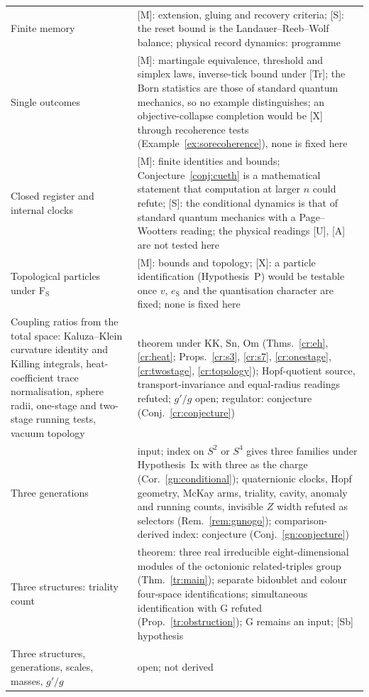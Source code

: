\documentclass[aps,pra,onecolumn,superscriptaddress,nofootinbib,10pt]{revtex4-2}
\theoremstyle{definition}
\theoremstyle{remark}
\begin{document}
\begin{table}[h]
\begin{tabular}{@{}p{}p{}@{}}
Finite memory & [M]: extension, gluing and recovery criteria; [S]: the reset bound is the Landauer--Reeb--Wolf balance; physical record dynamics: programme\\
Single outcomes & [M]: martingale equivalence, threshold and simplex laws, inverse-tick bound under [Tr]; the Born statistics are those of standard quantum mechanics, so no example distinguishes; an objective-collapse completion would be [X] through recoherence tests (Example~\ref{ex:sorecoherence}), none is fixed here\\
Closed register and internal clocks & [M]: finite identities and bounds; Conjecture~\ref{conj:cueth} is a mathematical statement that computation at larger $n$ could refute; [S]: the conditional dynamics is that of standard quantum mechanics with a Page--Wootters reading; the physical readings [U], [A] are not tested here\\
Topological particles under F$_{\mathrm S}$ & [M]: bounds and topology; [X]: a particle identification (Hypothesis~P) would be testable once $v$, $e_{\mathrm S}$ and the quantisation character are fixed; none is fixed here\\
Coupling ratios from the total space: Kaluza--Klein curvature identity and Killing integrals, heat-coefficient trace normalisation, sphere radii, one-stage and two-stage running tests, vacuum topology & theorem under KK, Sn, Om (Thms.~\ref{cr:eh}, \ref{cr:heat}; Props.~\ref{cr:s3}, \ref{cr:s7}, \ref{cr:onestage}, \ref{cr:twostage}, \ref{cr:topology}); Hopf-quotient source, transport-invariance and equal-radius readings refuted; $g'/g$ open; regulator: conjecture (Conj.~\ref{cr:conjecture})\\
Three generations & input; index on $S^2$ or $S^4$ gives three families under Hypothesis~Ix with three as the charge (Cor.~\ref{gn:conditional}); quaternionic clocks, Hopf geometry, McKay arms, triality, cavity, anomaly and running counts, invisible $Z$ width refuted as selectors (Rem.~\ref{rem:gnnogo}); comparison-derived index: conjecture (Conj.~\ref{gn:conjecture})\\
Three structures: triality count & theorem: three real irreducible eight-dimensional modules of the octonionic related-triples group (Thm.~\ref{tr:main}); separate bidoublet and colour four-space identifications; simultaneous identification with G refuted (Prop.~\ref{tr:obstruction}); G remains an input; [Sb] hypothesis\\
Three structures, generations, scales, masses, $g'/g$ & open; not derived\\
\bottomrule
\end{tabular}
\end{table}
\end{document}
